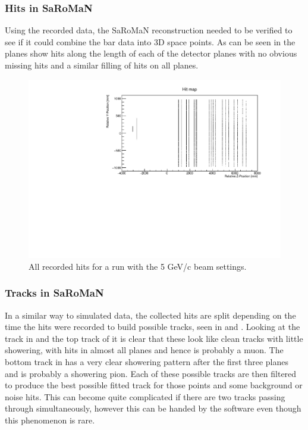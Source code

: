 \subsubsection{Hits in SaRoMaN}
Using the recorded data, the SaRoMaN reconstruction needed to be verified to see if it could combine the bar data into 3D space points. As can be seen in  the planes show hits along the length of each of the detector planes with no obvious missing hits and a similar filling of hits on all planes.

\begin{figure}[h!]
\centering
\includegraphics[width=\textwidth]{figures/HitMap5GeVYZ.pdf}
\caption{All recorded hits for a run with the 5 GeV/c beam settings.}
\label{fig:hitmap}
\end{figure}


\subsubsection{Tracks in SaRoMaN}
In a similar way to simulated data, the collected hits are split depending on the time the hits were recorded to build possible tracks, seen in  and . Looking at the track in  and the top track of  it is clear that these look like clean tracks with little showering, with hits in almost all planes and hence is probably a muon. The bottom track in  has a very clear showering pattern after the first three planes and is probably a showering pion. Each of these possible tracks are then filtered to produce the best possible fitted track for those points and some background or noise hits. This can become quite complicated if there are two tracks passing through simultaneously, however this can be handed by the software even though this phenomenon is rare.

